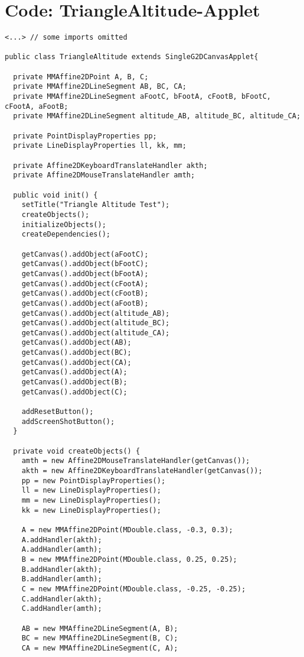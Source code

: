 
\section{Code: TriangleAltitude-Applet}
\begin{footnotesize}
\begin{verbatim}
<...> // some imports omitted

public class TriangleAltitude extends SingleG2DCanvasApplet{
  
  private MMAffine2DPoint A, B, C;
  private MMAffine2DLineSegment AB, BC, CA;
  private MMAffine2DLineSegment aFootC, bFootA, cFootB, bFootC, cFootA, aFootB;
  private MMAffine2DLineSegment altitude_AB, altitude_BC, altitude_CA;
  
  private PointDisplayProperties pp;
  private LineDisplayProperties ll, kk, mm;
  
  private Affine2DKeyboardTranslateHandler akth;
  private Affine2DMouseTranslateHandler amth;
  
  public void init() {
    setTitle("Triangle Altitude Test");
    createObjects();
    initializeObjects();
    createDependencies();

    getCanvas().addObject(aFootC);
    getCanvas().addObject(bFootC);
    getCanvas().addObject(bFootA);
    getCanvas().addObject(cFootA);
    getCanvas().addObject(cFootB);
    getCanvas().addObject(aFootB);
    getCanvas().addObject(altitude_AB);
    getCanvas().addObject(altitude_BC);
    getCanvas().addObject(altitude_CA);
    getCanvas().addObject(AB);
    getCanvas().addObject(BC);
    getCanvas().addObject(CA);
    getCanvas().addObject(A);
    getCanvas().addObject(B);
    getCanvas().addObject(C);
    
    addResetButton();
    addScreenShotButton();
  }
  
  private void createObjects() {
    amth = new Affine2DMouseTranslateHandler(getCanvas());
    akth = new Affine2DKeyboardTranslateHandler(getCanvas());
    pp = new PointDisplayProperties();
    ll = new LineDisplayProperties();
    mm = new LineDisplayProperties();
    kk = new LineDisplayProperties();
    
    A = new MMAffine2DPoint(MDouble.class, -0.3, 0.3);
    A.addHandler(akth);
    A.addHandler(amth);
    B = new MMAffine2DPoint(MDouble.class, 0.25, 0.25);
    B.addHandler(akth);
    B.addHandler(amth);
    C = new MMAffine2DPoint(MDouble.class, -0.25, -0.25);
    C.addHandler(akth);
    C.addHandler(amth);
    
    AB = new MMAffine2DLineSegment(A, B);
    BC = new MMAffine2DLineSegment(B, C);
    CA = new MMAffine2DLineSegment(C, A);
    

\end{verbatim}
\end{footnotesize}
